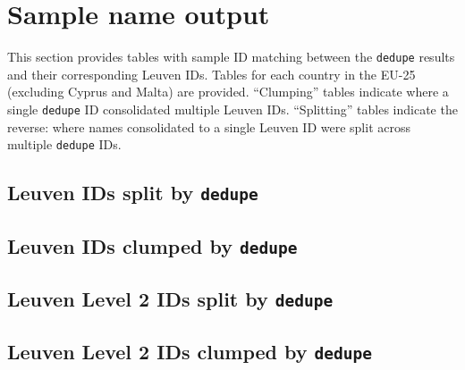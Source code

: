 \documentclass[11pt]{article}
\begin{document}
\section{Sample name output}
\label{sec:sample-name-output}

This section provides tables with sample ID matching between the
\texttt{dedupe} results and their corresponding Leuven IDs. Tables for
each country in the EU-25 (excluding Cyprus and Malta) are
provided. ``Clumping'' tables indicate where a single \texttt{dedupe}
ID consolidated multiple Leuven IDs. ``Splitting'' tables indicate the
reverse: where names consolidated to a single Leuven ID were split
across multiple \texttt{dedupe} IDs. 

\subsection{Leuven IDs split by \texttt{dedupe} }
\label{sec:leuven-ids-split}
\footnotesize


\subsection{Leuven IDs clumped by \texttt{dedupe}}
\label{sec:leuven-ids-clumped}

\footnotesize



\subsection{Leuven Level 2 IDs split by \texttt{dedupe}}
\label{sec:leuven-level-2}

\footnotesize


\subsection{Leuven Level 2 IDs clumped by \texttt{dedupe}}
\label{sec:leuven-level-2-1}

\footnotesize




\end{document}
